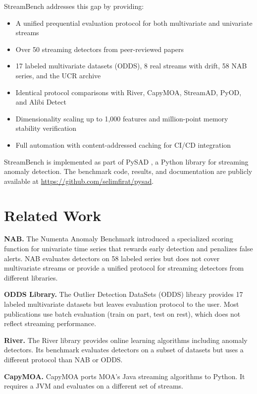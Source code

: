 \documentclass[11pt,a4paper]{article}
\begin{document}
StreamBench addresses this gap by providing:
\begin{itemize}
    \item A unified prequential evaluation protocol for both multivariate and univariate streams
    \item Over 50 streaming detectors from peer-reviewed papers
    \item 17 labeled multivariate datasets (ODDS), 8 real streams with drift, 58 NAB series, and the UCR archive
    \item Identical protocol comparisons with River, CapyMOA, StreamAD, PyOD, and Alibi Detect
    \item Dimensionality scaling up to 1,000 features and million-point memory stability verification
    \item Full automation with content-addressed caching for CI/CD integration
\end{itemize}

StreamBench is implemented as part of PySAD \citep{pysad}, a Python library for streaming anomaly detection. The benchmark code, results, and documentation are publicly available at \url{https://github.com/selimfirat/pysad}.

\section{Related Work}
\label{sec:related}

\textbf{NAB.} The Numenta Anomaly Benchmark \citep{ahmad2017unsupervised} introduced a specialized scoring function for univariate time series that rewards early detection and penalizes false alerts. NAB evaluates detectors on 58 labeled series but does not cover multivariate streams or provide a unified protocol for streaming detectors from different libraries.

\textbf{ODDS Library.} The Outlier Detection DataSets (ODDS) library \citep{rayana2016odds} provides 17 labeled multivariate datasets but leaves evaluation protocol to the user. Most publications use batch evaluation (train on part, test on rest), which does not reflect streaming performance.

\textbf{River.} The River library \citep{river2021} provides online learning algorithms including anomaly detectors. Its benchmark evaluates detectors on a subset of datasets but uses a different protocol than NAB or ODDS.

\textbf{CapyMOA.} CapyMOA \citep{capymoa2023} ports MOA's Java streaming algorithms to Python. It requires a JVM and evaluates on a different set of streams.
\end{document}
